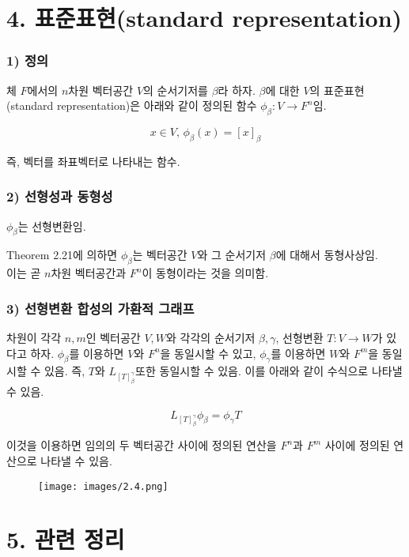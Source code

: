 \documentclass[10pt, a4paper]{article}
\begin{document}
\section*{4. 표준표현(standard representation)}
\subsubsection*{1) 정의}
체 $F$에서의 $n$차원 벡터공간 $V$의 순서기저를 $\beta$라 하자. $\beta$에 대한 $V$의 표준표현(standard representation)은 아래와 같이 정의된 함수 $\phi_{\beta}:V \rightarrow F^n$임.

\[
x \in V,\,\phi_{\beta}(x)=[x]_{\beta}
\]

즉, 벡터를 좌표벡터로 나타내는 함수.

\subsubsection*{2) 선형성과 동형성}
$\phi_{\beta}$는 선형변환임.

Theorem 2.21에 의하면 $\phi_{\beta}$는 벡터공간 $V$와 그 순서기저 $\beta$에 대해서 동형사상임.\\
이는 곧 $n$차원 벡터공간과 $F^n$이 동형이라는 것을 의미함.


\newpage


\subsubsection*{3) 선형변환 합성의 가환적 그래프}
차원이 각각 $n,m$인 벡터공간 $V,W$와 각각의 순서기저 $\beta, \gamma$, 선형변환 $T:V \rightarrow W$가 있다고 하자. $\phi_{\beta}$를 이용하면 $V$와 $F^n$을 동일시할 수 있고, $\phi_{\gamma}$를 이용하면 $W$와 $F^m$을 동일시할 수 있음. 즉, $T$와 $L_{[T]_{\beta}^{\gamma}}$또한 동일시할 수 있음. 이를 아래와 같이 수식으로 나타낼 수 있음.

\[
L_{[T]_{\beta}^{\gamma}}\phi_{\beta}=\phi_{\gamma}T
\]

이것을 이용하면 임의의 두 벡터공간 사이에 정의된 연산을 $F^n$과 $F^m$ 사이에 정의된 연산으로 나타낼 수 있음.

\begin{figure}[hbt!]
    \centering
    \texttt{[image: images/2.4.png]}\\
\end{figure}

\section*{5. 관련 정리}
\end{document}

